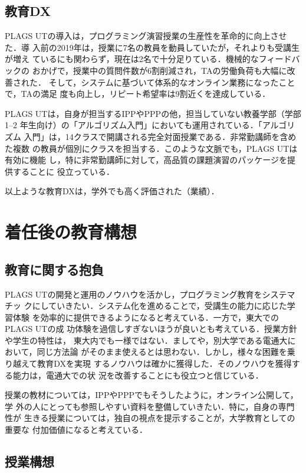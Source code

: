 \documentclass[dvipdfmx]{jsarticle}
\begin{document}
\subsection*{教育DX}
PLAGS UTの導入は，プログラミング演習授業の生産性を革命的に向上させた．導
入前の2019年は，授業に7名の教員を動員していたが，それよりも受講生が増え
ているにも関わらず，現在は2名で十分足りている．機械的なフィードバックの
おかげで，授業中の質問件数が6割削減され，TAの労働負荷も大幅に改善された．
そして，システムに基づいて体系的なオンライン業務になったことで，TAの満足
度も向上し，リピート希望率は9割近くを達成している．

PLAGS UTは，自身が担当するIPPやPPPの他，担当していない教養学部（学部1--2
年生向け）の「アルゴリズム入門」においても運用されている．「アルゴリズム
入門」は，14クラスで開講される完全対面授業である．非常勤講師を含めた複数
の教員が個別にクラスを担当する．このような文脈でも，PLAGS UTは有効に機能
し，特に非常勤講師に対して，高品質の課題演習のパッケージを提供することに
役立っている．

以上ような教育DXは，学外でも高く評価された（業績\cite{axies22:plags}）．


\section*{着任後の教育構想}

\subsection*{教育に関する抱負}
PLAGS UTの開発と運用のノウハウを活かし，プログラミング教育をシステマチッ
クにしていきたい．システム化を進めることで，受講生の能力に応じた学習体験
を効率的に提供できるようになると考えている．一方で，東大でのPLAGS UTの成
功体験を過信しすぎないほうが良いとも考えている．授業方針や学生の特性は，
東大内でも一様ではない．ましてや，別大学である電通大において，同じ方法論
がそのまま使えるとは思わない．しかし，様々な困難を乗り越えて教育DXを実現
するノウハウは確かに獲得した．そのノウハウを獲得する能力は，電通大での状
況を改善することにも役立つと信じている．

授業の教材については，IPPやPPPでもそうしたように，オンライン公開して，学
外の人にとっても参照しやすい資料を整備していきたい．特に，自身の専門性が
生きる授業については，独自の視点を提示することが，大学教育としての重要な
付加価値になると考えている．

\subsection*{授業構想}
\end{document}
